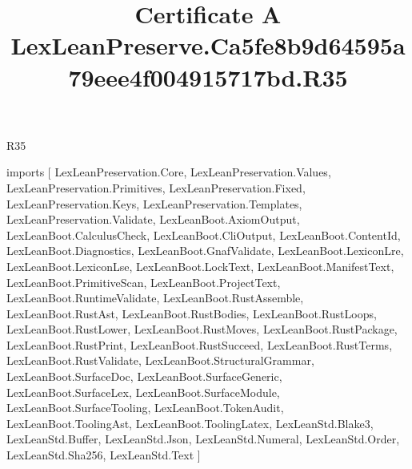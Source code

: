 \begin{lexlean}{R35}
\title{Certificate A LexLeanPreserve.Ca5fe8b9d64595a79eee4f004915717bd.R35}
\begin{coremodule}
imports [
  LexLeanPreservation.Core,
  LexLeanPreservation.Values,
  LexLeanPreservation.Primitives,
  LexLeanPreservation.Fixed,
  LexLeanPreservation.Keys,
  LexLeanPreservation.Templates,
  LexLeanPreservation.Validate,
  LexLeanBoot.AxiomOutput,
  LexLeanBoot.CalculusCheck,
  LexLeanBoot.CliOutput,
  LexLeanBoot.ContentId,
  LexLeanBoot.Diagnostics,
  LexLeanBoot.GnafValidate,
  LexLeanBoot.LexiconLre,
  LexLeanBoot.LexiconLse,
  LexLeanBoot.LockText,
  LexLeanBoot.ManifestText,
  LexLeanBoot.PrimitiveScan,
  LexLeanBoot.ProjectText,
  LexLeanBoot.RuntimeValidate,
  LexLeanBoot.RustAssemble,
  LexLeanBoot.RustAst,
  LexLeanBoot.RustBodies,
  LexLeanBoot.RustLoops,
  LexLeanBoot.RustLower,
  LexLeanBoot.RustMoves,
  LexLeanBoot.RustPackage,
  LexLeanBoot.RustPrint,
  LexLeanBoot.RustSucceed,
  LexLeanBoot.RustTerms,
  LexLeanBoot.RustValidate,
  LexLeanBoot.StructuralGrammar,
  LexLeanBoot.SurfaceDoc,
  LexLeanBoot.SurfaceGeneric,
  LexLeanBoot.SurfaceLex,
  LexLeanBoot.SurfaceModule,
  LexLeanBoot.SurfaceTooling,
  LexLeanBoot.TokenAudit,
  LexLeanBoot.ToolingAst,
  LexLeanBoot.ToolingLatex,
  LexLeanStd.Blake3,
  LexLeanStd.Buffer,
  LexLeanStd.Json,
  LexLeanStd.Numeral,
  LexLeanStd.Order,
  LexLeanStd.Sha256,
  LexLeanStd.Text
]


\end{coremodule}
\end{lexlean}
